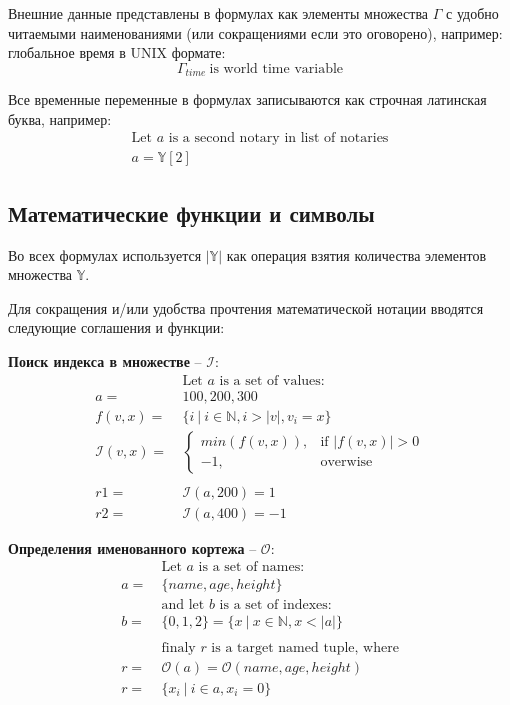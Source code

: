 \documentclass[12pt]{report}
\begin{document}
\begin{multicols}{2}
Внешние данные представлены в формулах как элементы множества $\Gamma$ с удобно читаемыми наименованиями (или сокращениями если это оговорено), например: глобальное время в UNIX формате:
\begin{equation}
\Gamma_{time} \ \text{is world time variable}
\end{equation}

Все временные переменные в формулах записываются как строчная латинская буква, например:
\begin{equation}
\begin{aligned}
\text{Let } a \text{ is a second notary in list of notaries} \\
a = \mathbb{Y}[2]
\end{aligned}
\end{equation}
\end{multicols}

\subsection{Математические функции и символы}
\label{tech-review-math}
Во всех формулах используется $|\mathbb{Y}|$ как операция взятия количества элементов множества $\mathbb{Y}$.

Для сокращения и/или удобства прочтения математической нотации вводятся следующие соглашения и функции:

\textbf{Поиск индекса в множестве} – $\mathcal{I}$:
\begin{align}
&\ \text{Let } a \text{ is a set of values: } \nonumber\\
a =&\ {100, 200, 300} \nonumber\\
f(v, x) =&\ \{i \ | \ i \in \mathbb{N},  i > |v|, v_i = x \} \\
\mathcal{I}(v, x) =&\ \begin{cases}
	min(f(v,x)), & \text{if } |f(v, x)| > 0 \\
	-1, & \text{overwise}
\end{cases}
\\
\\
r1 = &\ \mathcal{I}(a, 200) = 1\nonumber \\
r2 = &\ \mathcal{I}(a, 400) = -1
\end{align}

\textbf{Определения именованного кортежа} – $\mathcal{O}$:
\begin{align}
&\ \text{Let } a \text{ is a set of names: } \nonumber\\
a =&\ \{name, age, height\} \nonumber\\
&\ \text{and let } b \text{ is a set of indexes: } \nonumber\\
b =&\ \{0, 1, 2\} = \{x \ | \ x \in \mathbb{N}, x < |a|\} \\
& \nonumber\\
&\ \text{finaly } r \text{ is a target named tuple, where} \nonumber\\
r =&\ \mathcal{O}(a) = \mathcal{O}(name, age, height) \\ 
r =&\ \{x_i \ | \ i \in  a, x_i = 0 \}
\end{align}
\end{document}
